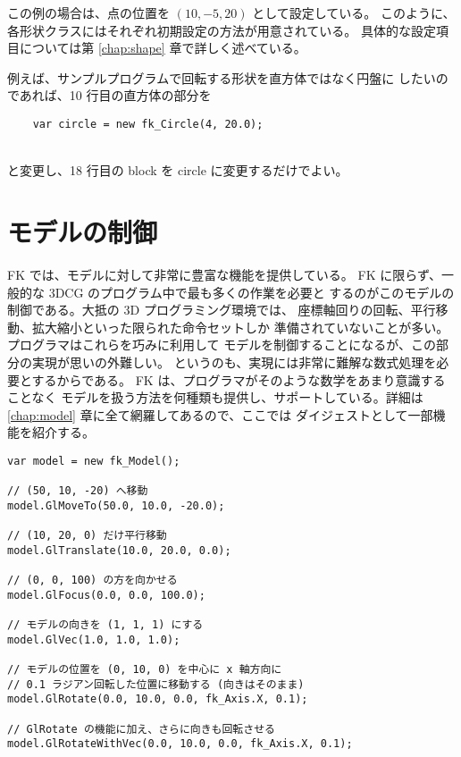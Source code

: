 この例の場合は、点の位置を \((10, -5, 20)\) として設定している。
このように、各形状クラスにはそれぞれ初期設定の方法が用意されている。
具体的な設定項目については第 \ref{chap:shape} 章で詳しく述べている。

例えば、サンプルプログラムで回転する形状を直方体ではなく円盤に
したいのであれば、10 行目の直方体の部分を
\\
\begin{screen}
\begin{verbatim}
    var circle = new fk_Circle(4, 20.0);
\end{verbatim}
\end{screen}
~ \\
と変更し、18 行目の block を circle に変更するだけでよい。

\section{モデルの制御}
FK では、モデルに対して非常に豊富な機能を提供している。
FK に限らず、一般的な 3DCG のプログラム中で最も多くの作業を必要と
するのがこのモデルの制御である。大抵の 3D プログラミング環境では、
座標軸回りの回転、平行移動、拡大縮小といった限られた命令セットしか
準備されていないことが多い。プログラマはこれらを巧みに利用して
モデルを制御することになるが、この部分の実現が思いの外難しい。
というのも、実現には非常に難解な数式処理を必要とするからである。
FK は、プログラマがそのような数学をあまり意識することなく
モデルを扱う方法を何種類も提供し、サポートしている。詳細は
\ref{chap:model} 章に全て網羅してあるので、ここでは
ダイジェストとして一部機能を紹介する。
\\
\begin{screen}
\begin{verbatim}
var model = new fk_Model();

// (50, 10, -20) へ移動
model.GlMoveTo(50.0, 10.0, -20.0);

// (10, 20, 0) だけ平行移動
model.GlTranslate(10.0, 20.0, 0.0);

// (0, 0, 100) の方を向かせる
model.GlFocus(0.0, 0.0, 100.0);

// モデルの向きを (1, 1, 1) にする
model.GlVec(1.0, 1.0, 1.0);

// モデルの位置を (0, 10, 0) を中心に x 軸方向に
// 0.1 ラジアン回転した位置に移動する (向きはそのまま)
model.GlRotate(0.0, 10.0, 0.0, fk_Axis.X, 0.1);

// GlRotate の機能に加え、さらに向きも回転させる
model.GlRotateWithVec(0.0, 10.0, 0.0, fk_Axis.X, 0.1);
\end{verbatim}
\end{screen}
\\

